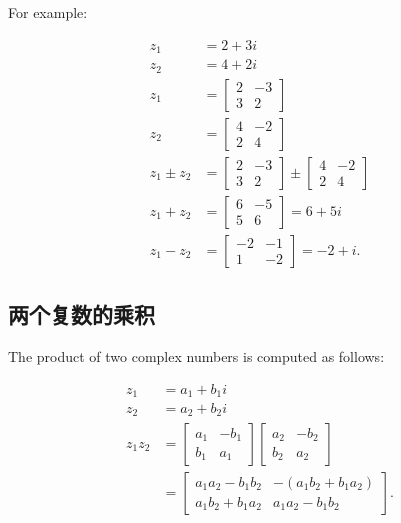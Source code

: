 For example:

$$
\begin{aligned}
z_{1} & =2+3 i \\
z_{2} & =4+2 i \\
z_{1} & =\left[\begin{array}{cc}
2 & -3 \\
3 & 2
\end{array}\right] \\
z_{2} & =\left[\begin{array}{cc}
4 & -2 \\
2 & 4
\end{array}\right] \\
z_{1} \pm z_{2} & =\left[\begin{array}{cc}
2 & -3 \\
3 & 2
\end{array}\right] \pm\left[\begin{array}{cc}
4 & -2 \\
2 & 4
\end{array}\right] \\
z_{1}+z_{2} & =\left[\begin{array}{cc}
6 & -5 \\
5 & 6
\end{array}\right]=6+5 i \\
z_{1}-z_{2} & =\left[\begin{array}{cc}
-2 & -1 \\
1 & -2
\end{array}\right]=-2+i .
\end{aligned}
$$

\subsection{两个复数的乘积}
The product of two complex numbers is computed as follows:

$$
\begin{aligned}
z_{1} & =a_{1}+b_{1} i \\
z_{2} & =a_{2}+b_{2} i \\
z_{1} z_{2} & =\left[\begin{array}{cc}
a_{1} & -b_{1} \\
b_{1} & a_{1}
\end{array}\right]\left[\begin{array}{cc}
a_{2} & -b_{2} \\
b_{2} & a_{2}
\end{array}\right] \\
& =\left[\begin{array}{cc}
a_{1} a_{2}-b_{1} b_{2} & -\left(a_{1} b_{2}+b_{1} a_{2}\right) \\
a_{1} b_{2}+b_{1} a_{2} & a_{1} a_{2}-b_{1} b_{2}
\end{array}\right] .
\end{aligned}
$$

